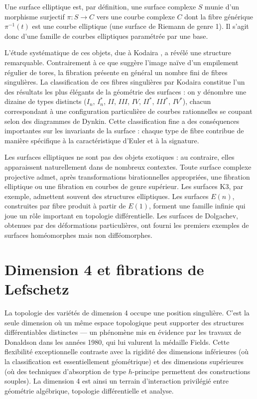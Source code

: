 Une surface elliptique est, par définition, une surface complexe $S$ munie d'un morphisme surjectif $\pi: S \to C$ vers une courbe complexe $C$ dont la fibre générique $\pi^{-1}(t)$ est une courbe elliptique (une surface de Riemann de genre 1). Il s'agit donc d'une famille de courbes elliptiques paramétrée par une base.

L'étude systématique de ces objets, due à Kodaira \cite{Kodaira63}, a révélé une structure remarquable. Contrairement à ce que suggère l'image naïve d'un empilement régulier de tores, la fibration présente en général un nombre fini de fibres singulières. La classification de ces fibres singulières par Kodaira constitue l'un des résultats les plus élégants de la géométrie des surfaces : on y dénombre une dizaine de types distincts ($I_n$, $I_n^*$, $II$, $III$, $IV$, $II^*$, $III^*$, $IV^*$), chacun correspondant à une configuration particulière de courbes rationnelles se coupant selon des diagrammes de Dynkin. Cette classification fine a des conséquences importantes sur les invariants de la surface : chaque type de fibre contribue de manière spécifique à la caractéristique d'Euler et à la signature.

Les surfaces elliptiques ne sont pas des objets exotiques : au contraire, elles apparaissent naturellement dans de nombreux contextes. Toute surface complexe projective admet, après transformations birationnelles appropriées, une fibration elliptique ou une fibration en courbes de genre supérieur. Les surfaces K3, par exemple, admettent souvent des structures elliptiques. Les surfaces $E(n)$, construites par fibre produit à partir de $E(1)$, forment une famille infinie qui joue un rôle important en topologie différentielle. Les surfaces de Dolgachev, obtenues par des déformations particulières, ont fourni les premiers exemples de surfaces homéomorphes mais non difféomorphes.

\section*{Dimension 4 et fibrations de Lefschetz}

La topologie des variétés de dimension 4 occupe une position singulière. C'est la seule dimension où un même espace topologique peut supporter des structures différentiables distinctes — un phénomène mis en évidence par les travaux de Donaldson dans les années 1980, qui lui valurent la médaille Fields. Cette flexibilité exceptionnelle contraste avec la rigidité des dimensions inférieures (où la classification est essentiellement géométrique) et des dimensions supérieures (où des techniques d'absorption de type $h$-principe permettent des constructions souples). La dimension 4 est ainsi un terrain d'interaction privilégié entre géométrie algébrique, topologie différentielle et analyse.

